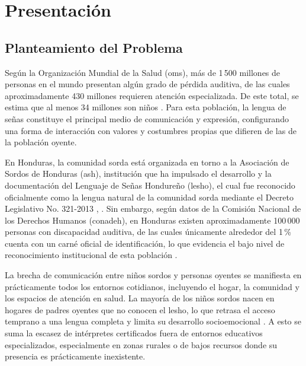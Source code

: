 \chapter[Presentación]{Presentación}
\label{cp:presentacion}

\insertminitoc
\parindent0pt

\section{Planteamiento del Problema}

Según la Organización Mundial de la Salud (\acrshort{oms}), más de 1\,500 millones de personas en
el mundo presentan algún grado de pérdida auditiva, de las cuales aproximadamente 430
millones requieren atención especializada. De este total, se estima que al menos 34 millones
son niños \cite{who_deafness_2024}. Para esta población, la lengua de señas constituye el principal medio de
comunicación y expresión, configurando una forma de interacción con valores y costumbres
propias que difieren de las de la población oyente.

En Honduras, la comunidad sorda está organizada en torno a la Asociación de Sordos de
Honduras (\acrshort{ash}), institución que ha impulsado el desarrollo y la documentación del
Lenguaje de Señas Hondureño (\acrshort{lesho}), el cual fue reconocido oficialmente como la lengua
natural de la comunidad sorda mediante el Decreto Legislativo No. 321-2013 \cite{congreso_decreto_2013}, \cite{ash_diccionario_2019}. Sin
embargo, según datos de la Comisión Nacional de los Derechos Humanos (\acrshort{conadeh}),
en Honduras existen aproximadamente 100\,000 personas con discapacidad auditiva, de las
cuales únicamente alrededor del 1\,\% cuenta con un carné oficial de identificación, lo que
evidencia el bajo nivel de reconocimiento institucional de esta población \cite{conadeh_discriminados}.

La brecha de comunicación entre niños sordos y personas oyentes se manifiesta en
prácticamente todos los entornos cotidianos, incluyendo el hogar, la comunidad y los
espacios de atención en salud. La mayoría de los niños sordos nacen en hogares de padres
oyentes que no conocen el \acrshort{lesho}, lo que retrasa el acceso temprano a una lengua completa
y limita su desarrollo socioemocional \cite{williams_encuesta_2015}. A esto se suma la escasez de intérpretes
certificados fuera de entornos educativos especializados, especialmente en zonas rurales
o de bajos recursos donde su presencia es prácticamente inexistente.

